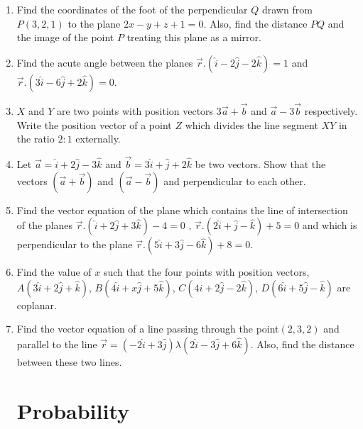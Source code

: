 \documentclass[10pt,-letter paper]{article}
\providecommand{\brak}[1]{\ensuremath{\left(#1\right)}}
\begin{document}
\begin{enumerate}
\item Find the coordinates of the foot of the perpendicular ${Q}$ drawn from ${P}\brak{3, 2, 1}$ to the plane $2x - y + z + 1 = 0$. Also, find the distance ${P}{Q}$ and the image of the point ${P}$ treating this plane as a mirror.
\item Find the acute angle between the planes $\overrightarrow{r}.\brak{\hat{i}-2\hat{j}-2\hat{k}}=1$ and $\overrightarrow{r}.\brak{3\hat{i}-6\hat{j}+2\hat{k}}=0$.
\item $X$ and $Y$ are two points with position vectors ${3 \overrightarrow{a} + \overrightarrow{b}}$ and ${\overrightarrow{a} - 3 \overrightarrow{b}}$ respectively. Write the position vector of a point $Z$ which divides the line segment $XY$ in the ratio $2 : 1$ externally.
\item Let ${\overrightarrow{a} = \hat{i} + 2\hat{j} - 3\hat{k}}$ and ${\overrightarrow{b} = 3\hat{i} + \hat{j} + 2\hat{k}}$ be two vectors. Show that the vectors \brak{\overrightarrow{a} + \overrightarrow{b}} and \brak{\overrightarrow{a} - \overrightarrow{b}} and perpendicular to each other.
\item Find the vector equation of the plane which contains the line of intersection of the planes $ \overrightarrow{r}.\brak{\hat{i} + 2\hat{j}+3\hat{k}}-4=0$ , $\overrightarrow{r}.\brak{2\hat{i} + \hat{j} - \hat{k}}+5=0$ and which is perpendicular to the plane $\overrightarrow{r}.\brak{5\hat{i} + 3\hat{j} - 6\hat{k}}+8=0$.
\item Find the value of $x$ such that the four points with position vectors,$A\brak{3\hat{i} + 2\hat{j} + \hat{k}}$, $B\brak{4\hat{i} + x\hat{j} + 5\hat{k}}$, $C\brak{4\hat{i} + 2\hat{j} -2 \hat{k}}$, $D\brak{6\hat{i} + 5\hat{j} - \hat{k}}$ are coplanar.
\item Find the vector equation of a line passing through the point$\brak{2, 3, 2}$ and parallel to the line $\overrightarrow{r}=\brak{-2\hat{i} +3\hat{j}}\lambda\brak{2\hat{i} - 3\hat{j}+6\hat{k}}$. Also, find the distance between these two lines.

\section{Probability}


\end{enumerate}
\end{document}
